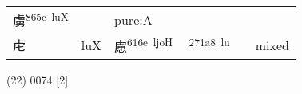 \documentclass[14pt,a4paper]{scrartcl}
\begin{document}
\begin{longtable}[c]{@{}llllll@{}}
\begin{minipage}[t]{0.14\columnwidth}
虜\textsuperscript{865c~luX}
\strut\end{minipage} &
\begin{minipage}[t]{0.14\columnwidth}\raggedright\strut
\strut\end{minipage} &
\begin{minipage}[t]{0.14\columnwidth}\raggedright\strut
pure:A
\strut\end{minipage}\tabularnewline
\begin{minipage}[t]{0.14\columnwidth}\raggedright\strut
虍
\strut\end{minipage} &
\begin{minipage}[t]{0.14\columnwidth}\raggedright\strut
luX
\strut\end{minipage} &
\begin{minipage}[t]{0.14\columnwidth}\raggedright\strut
慮\textsuperscript{616e~ljoH}
\strut\end{minipage} &
\begin{minipage}[t]{0.14\columnwidth}\raggedright\strut
𧆨\textsuperscript{271a8~lu}
\strut\end{minipage} &
\begin{minipage}[t]{0.14\columnwidth}\raggedright\strut
\strut\end{minipage} &
\begin{minipage}[t]{0.14\columnwidth}\raggedright\strut
mixed
\strut\end{minipage}\tabularnewline
\bottomrule
\end{longtable}

(22) 0074 {[}2{]}
\end{document}
